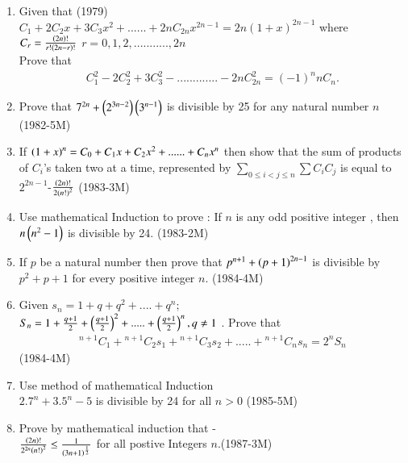 \documentclass[journal,12pt,twocolumn]{IEEEtran}
\theoremstyle{remark}
\begin{document}
    
     \begin{enumerate}
		
          \item Given that  \hfill{(1979)} \\
$C_1+2C_2x+3C_3x^2+......+2nC_{2n}x^{2n-1}=2n(1+x)^{2n-1} $   
		where $C_r =\frac{\left(2n\right)!}{r!\left(2n-r\right)!}$ $r=0,1,2,...........,2n$\\
		          Prove that  \begin{align*} 
		     C^2_1-2C_2^2+3C_3^2-.............-2nC_{2n}^2  = (-1)^nnC_n. 
		     \end{align*}  

	   \item Prove that $ 7^{2n} + \left(2^{3n-2}\right)  \left(3^{n-1}\right) $ is divisible by 25 for any natural number $ n$ \hfill{(1982-5M)}  


           \item If $ \left(1+x\right)^n= C_0 + C_1x +C_2x^2+......+C_nx^n $ then show that the sum of products of $ C_i $'s taken
		   two at a time, represented by $ \displaystyle\sum_{0 \leq i<j \leq n} \displaystyle\sum C_i C_j $ is equal to $ 2^{2n-1}$-$\frac{\left(2n\right)!} {2\left(n!\right)^2} $ \hfill{(1983-3M)}

	   \item Use mathematical Induction to prove : If $n$ is any odd positive integer , then  $ n\left(n^2-1\right) $ is divisible by 24.
		   \hfill{(1983-2M)}


	   \item If $ p $ be a natural number then prove that $ p^{n+1}+\left(p+1\right)^{2n-1} $ is divisible by $ p^2+p+1 $ for every positive integer $n$. \hfill{(1984-4M)} 

            \item Given  $ s_n = 1 + q + q^2 +....+q^n;$\\
		    $ S_n = 1 + \frac{q+1}{2}+\left(\frac{q+1}{2}\right)^2+.....+\left(\frac{q+1}{2}\right)^n,q\neq1 $ . Prove that	\begin{align*} 
		    {}^{n+1}C_1+{}^{n+1}C_2s_1+{}^{n+1}C_3s_2+.....+{}^{n+1}C_ns_n=2^nS_n
		    \end{align*}    \hfill{(1984-4M)}


	    \item Use method of mathematical Induction \\ $ 2.7^n +3.5^n-5 $ is divisible by 24 for all $ n>0 $ \hfill{(1985-5M)}


	    \item Prove by mathematical induction that -\\
		    $ \frac{\left(2n\right)!}{2^{2n}\left(n!\right)^2}\leq \frac{1}{\left(3n+1\right)^{\frac{1}{2}}} $  for all postive Integers $n$.\hfill {(1987-3M)}



\end{enumerate}
\end{document}
